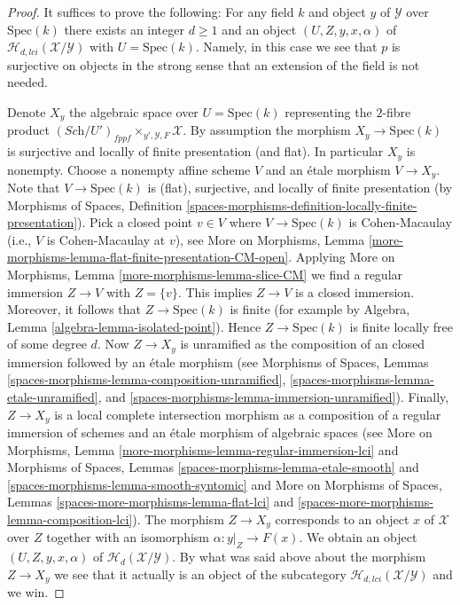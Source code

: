 \begin{proof}
It suffices to prove the following: For any field $k$
and object $y$ of $\mathcal{Y}$ over $\text{Spec}(k)$ there exists
an integer $d \geq 1$ and an object $(U, Z, y, x, \alpha)$ of
$\mathcal{H}_{d, lci}(\mathcal{X}/\mathcal{Y})$ with $U = \text{Spec}(k)$.
Namely, in this case we see that $p$ is surjective on objects in the
strong sense that an extension of the field is not needed.

\medskip\noindent
Denote $X_y$ the algebraic space over $U = \text{Spec}(k)$
representing the $2$-fibre product
$(\textit{Sch}/U')_{fppf} \times_{y', \mathcal{Y}, F} \mathcal{X}$.
By assumption the morphism $X_y \to \text{Spec}(k)$ is surjective and
locally of finite presentation (and flat). In particular $X_y$ is
nonempty. Choose a nonempty affine scheme $V$ and an \'etale morphism
$V \to X_y$. Note that $V \to \text{Spec}(k)$ is (flat), surjective,
and locally of finite presentation (by
Morphisms of Spaces,
Definition \ref{spaces-morphisms-definition-locally-finite-presentation}).
Pick a closed point $v \in V$ where $V \to \text{Spec}(k)$ is Cohen-Macaulay
(i.e., $V$ is Cohen-Macaulay at $v$), see
More on Morphisms,
Lemma \ref{more-morphisms-lemma-flat-finite-presentation-CM-open}.
Applying
More on Morphisms,
Lemma \ref{more-morphisms-lemma-slice-CM}
we find a regular immersion $Z \to V$ with $Z = \{v\}$.
This implies $Z \to V$ is a closed immersion. Moreover, it follows that
$Z \to \text{Spec}(k)$ is finite (for example by
Algebra, Lemma \ref{algebra-lemma-isolated-point}).
Hence $Z \to \text{Spec}(k)$ is finite locally free of some degree $d$.
Now $Z \to X_y$ is unramified as the composition
of an closed immersion followed by an \'etale morphism
(see
Morphisms of Spaces, Lemmas \ref{spaces-morphisms-lemma-composition-unramified},
\ref{spaces-morphisms-lemma-etale-unramified}, and
\ref{spaces-morphisms-lemma-immersion-unramified}).
Finally, $Z \to X_y$ is a local complete intersection morphism
as a composition of a regular immersion of schemes and an \'etale
morphism of algebraic spaces (see
More on Morphisms, Lemma \ref{more-morphisms-lemma-regular-immersion-lci}
and
Morphisms of Spaces, Lemmas \ref{spaces-morphisms-lemma-etale-smooth} and
\ref{spaces-morphisms-lemma-smooth-syntomic} and
More on Morphisms of Spaces,
Lemmas \ref{spaces-more-morphisms-lemma-flat-lci} and
\ref{spaces-more-morphisms-lemma-composition-lci}).
The morphism $Z \to X_y$ corresponds to an object $x$ of $\mathcal{X}$
over $Z$ together with an isomorphism $\alpha : y|_Z \to F(x)$.
We obtain an object $(U, Z, y, x, \alpha)$ of
$\mathcal{H}_d(\mathcal{X}/\mathcal{Y})$. By what was said above about
the morphism $Z \to X_y$ we see that it actually is an object of the
subcategory $\mathcal{H}_{d, lci}(\mathcal{X}/\mathcal{Y})$ and we win.
\end{proof}




















